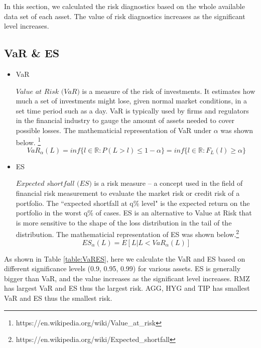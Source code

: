 In this section, we calculated the risk diagnostics based on the whole available data set of each asset. The value of risk diagnostics increases as the significant level increases.  

\subsection{VaR \& ES}

\begin{itemize}
\item VaR

$\textit{Value at Risk (VaR)}$ is a measure of the risk of investments. It estimates how much a set of investments might lose, given normal market conditions, in a set time period such as a day. VaR is typically used by firms and regulators in the financial industry to gauge the amount of assets needed to cover possible losses. The mathematicial representation of VaR under $\alpha$ was shown below. \footnote{https://en.wikipedia.org/wiki/Value\_at\_risk}
\begin{equation}
VaR_{\alpha}(L) = inf\{l \in \mathbb{R} : P(L > l) \leq 1-\alpha \} = 
inf\{l \in \mathbb{R} : F_L(l) \geq \alpha \}
\end{equation}
\item ES

$\textit{Expected shortfall (ES)}$ is a risk measure -- a concept used in the field of financial risk measurement to evaluate the market risk or credit risk of a portfolio. The ``expected shortfall at q\% level" is the expected return on the portfolio in the worst q\% of cases. ES is an alternative to Value at Risk that is more sensitive to the shape of the loss distribution in the tail of the distribution. The mathematicial representation of ES was shown below.\footnote{https://en.wikipedia.org/wiki/Expected\_shortfall}
\begin{equation}
ES_{\alpha}(L) = E\left[ L \vert L<VaR_{\alpha}(L) \right]
\end{equation}

\end{itemize}

As shown in Table \ref{table:VaRES}, here we calculate the VaR and ES based on different significance levels (0.9, 0.95, 0.99) for various assets. ES is generally bigger than VaR, and the value increases as the significant level increases. RMZ has largest VaR and ES thus the largest risk. AGG, HYG and TIP has smallest VaR and ES thus the smallest risk. 

